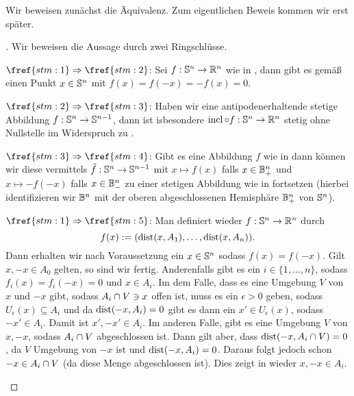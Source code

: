 \documentclass[10pt,a4paper]{article}
\begin{document}
Wir beweisen zunächst die Äquivalenz. Zum eigentlichen Beweis kommen wir erst später.

\begin{proof}[]
    Wir beweisen die Aussage durch zwei Ringschlüsse.
    \begin{implications}  
            \item[$\fref{stm:1}\implies\fref{stm:2}$:]
        Sei $f:\mathbb{S}^n\rightarrow\mathbb{R}^n$ wie in , dann gibt es gemäß  einen Punkt $x\in\mathbb{S}^n$ mit $f(x)=f(-x)=-f(x)=0$.
        
            \item[$\fref{stm:2}\implies\fref{stm:3}$:]
        Haben wir eine antipodenerhaltende stetige Abbildung $f:\mathbb{S}^n\rightarrow\mathbb{S}^{n-1}$, dann ist isbesondere $\mathop\mathrm{incl}\circ f:\mathbb{S}^n\rightarrow\mathbb{R}^n$ stetig ohne Nullstelle im Widerspruch zu .

            \item[$\fref{stm:3}\implies\fref{stm:4}$:]
        Gibt es eine Abbildung $f$ wie in  dann können wir diese vermittels $\tilde f:\mathbb{S}^n\rightarrow\mathbb{S}^{n-1}$ mit $x \mapsto f(x)$ falls $x\in\mathbb{B}^n_+$ und $x\mapsto -f(-x)$ falls $x\in\mathbb{B}^n_-$ zu einer stetigen Abbildung wie in  fortsetzen (hierbei identifizieren wir $\mathbb{B}^n$ mit der oberen abgeschlossenen Hemisphäre $\mathbb{B}^n_+$ von $\mathbb{S}^n$).

            \item[$\fref{stm:1}\implies\fref{stm:5}$:]
        Man definiert wieder $f:\mathbb{S}^n\rightarrow\mathbb{R}^n$ durch
        \[f(x):=(\mathop\mathrm{dist}(x,A_1),\ldots,\mathop\mathrm{dist}(x,A_n)).\]
        Dann erhalten wir nach Voraussetzung ein $x\in\mathbb{S}^n$ sodass $f(x)=f(-x)$. Gilt $x,-x\in A_0$ gelten, so sind wir fertig.
        Anderenfalls gibt es ein $i\in \{1,\ldots,n\}$, sodass $f_i(x)=f_i(-x)=0$ und $x\in A_i$.
        Im dem Falle, dass es eine Umgebung $V$ von $x$ und $-x$ gibt, sodass $A_i\cap V\ni x$ offen ist, muss es ein $\epsilon>0$ geben, sodass $U_{\epsilon}(x)\subseteq A_i$ und da $\mathop\mathrm{dist}(-x,A_i)=0$ gibt es dann ein $x'\in U_{\epsilon}(x)$, sodass $-x'\in A_i$.
        Damit ist $x',-x'\in A_i$. Im anderen Falle, gibt es eine Umgebung $V$ von $x,-x$, sodass $A_i\cap V$ abgeschlossen ist.
        Dann gilt aber, dass $\mathop\mathrm{dist}(-x,A_i\cap V)=0$, da $V$ Umgebung von $-x$ ist und $\mathop\mathrm{dist}(-x,A_i)=0$.
        Daraus folgt jedoch schon $-x\in A_i\cap V$ (da diese Menge abgeschlossen ist). Dies zeigt in wieder $x,-x\in A_i$.


\end{implications}
\end{proof}
\end{document}
